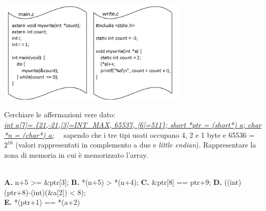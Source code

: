 \begin{questions}
\begin{minipage}[h]{0.5\linewidth}
	\includegraphics[width=9cm, keepaspectratio]{immagini/es_linkage_uniti}
\end{minipage}
\begin{minipage}[h]{0.5\linewidth}
	\makeemptybox{300pt}
\end{minipage}



\vspace{3em}


\question[6]
Cerchiare le affermazioni vere dato:\\ 
\underline{\emph{int a[7]= \{21,-21,[3]=INT\_MAX, 65537, [6]=511\}; short *ptr = (short*) a; char *n = (char*) a;}} ~~sapendo che i tre tipi usati occupano 4, 2 e 1 byte e 65536 = $2^{16}$ (valori rappresentati in complemento a due e \emph{little endian}). Rappresentare la zona di memoria in cui è memorizzato l'array.\\~

\textbf{A.} n+5 >= \&ptr[3]; \textbf{B.} *(n+5) > *(n+4); \textbf{C.} \&ptr[8] == ptr+9; \textbf{D.} ((int)(ptr+8)-(int)(\&a[2]) < 8);\\ \textbf{E.} *(ptr+1) == *(a+2)


\end{questions}
